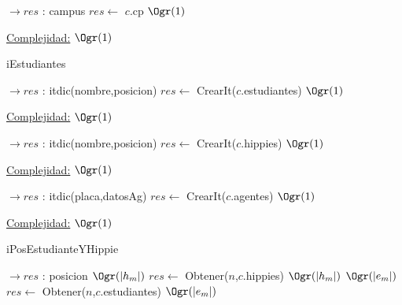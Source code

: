 \begin{Representacion}
\begin{Algoritmos}
\begin{algorithm}[H]
\begin{algorithmic}[1]
  $\to res$ : campus
  \State $res \gets$ $c$.cp \Comment $\Ogr(1)$
 \EndProcedure
\end{algorithmic}

 \underline{Complejidad:} $\Ogr(1)$
\end{algorithm}


\begin{algorithm}[H]
\caption{iEstudiantes}

\begin{algorithmic}[1]
  $\to res$ : itdic(nombre,posicion)
  \State $res \gets$ CrearIt($c$.estudiantes) \Comment $\Ogr(1)$
 \EndProcedure
\end{algorithmic}
 \underline{Complejidad:} $\Ogr(1)$
\end{algorithm}


\begin{algorithm}[H]
\begin{algorithmic}[1]
	 $\to res$ : itdic(nombre,posicion)
	\State $res \gets$ CrearIt($c$.hippies) \Comment $\Ogr(1)$
	\EndProcedure
\end{algorithmic}
\underline{Complejidad:} $\Ogr(1)$
\end{algorithm}


\begin{algorithm}[H]
\begin{algorithmic}[1]
	 $\to res$ : itdic(placa,datosAg)
	\State $res \gets$ CrearIt($c$.agentes) \Comment $\Ogr(1)$
	\EndProcedure
\end{algorithmic}
\underline{Complejidad:} $\Ogr(1)$
\end{algorithm}



\begin{algorithm}[H]
\caption{iPosEstudianteYHippie}

\begin{algorithmic}[1]
 $\to res$ : posicion
	 \Comment $\Ogr(|h_m|)$
		\State $res \gets$ Obtener($n$,$c$.hippies) \Comment $\Ogr(|h_m|)$
	\Else
		 \Comment $\Ogr(|e_m|)$
			\State $res \gets$ Obtener($n$,$c$.estudiantes) \Comment $\Ogr(|e_m|)$
		\EndIf
	\EndIf	
 \EndProcedure
\end{algorithmic}


\end{algorithm}
\end{Algoritmos}
\end{Representacion}
